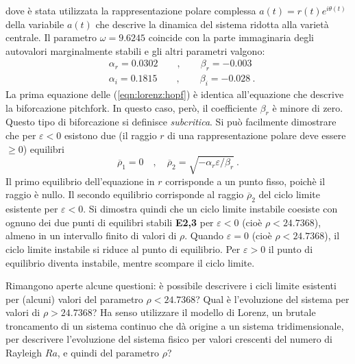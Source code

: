 dove è stata utilizzata la rappresentazione polare complessa $a(t) = r(t) e^{i \theta(t)}$
 della variabile $a(t)$ che descrive la dinamica del sistema ridotta alla varietà centrale.
 Il parametro $\omega = 9.6245$ coincide con la parte immaginaria degli autovalori marginalmente
 stabili e gli altri parametri valgono:
\begin{equation}
\begin{aligned}
 & \alpha_r = 0.0302 \qquad , \qquad \beta_r =-0.003 \\
 & \alpha_i = 0.1815 \qquad , \qquad \beta_i =-0.028 \ . 
\end{aligned}
\end{equation}
La prima equazione delle (\ref{eqn:lorenz:hopf}) è identica all'equazione che descrive la 
 biforcazione pitchfork. In questo caso, però, il coefficiente $\beta_r$ è minore di zero. Questo
 tipo di biforcazione si definisce \textit{subcritica}. Si può facilmente dimostrare che
 per $\varepsilon < 0$ esistono due (il raggio $r$ di una rappresentazione polare deve
 essere $\geq 0$) equilibri
\begin{equation}
 \overline{\rho}_1 = 0 \quad , \quad \overline{\rho}_2 = \sqrt{-\alpha_r \varepsilon / \beta_r} \ .
\end{equation}
Il primo equilibrio dell'equazione in $r$ corrisponde a un punto fisso, poichè il raggio è nullo.
 Il secondo equilibrio corrisponde al raggio $\overline{\rho}_2$ del ciclo limite
 esistente per $\varepsilon < 0$.
Si dimostra quindi che un ciclo limite instabile coesiste con ognuno dei due punti di
 equilibri stabili \textbf{E2,3} per $\varepsilon < 0$ (cioè $\rho < 24.7368$), almeno
 in un intervallo finito di valori di $\rho$.
Quando $\varepsilon = 0$ (cioè $\rho < 24.7368$), il ciclo limite instabile si riduce al punto
 di equilibrio. Per $\varepsilon > 0$ il punto di equilibrio diventa instabile, mentre
 scompare il ciclo limite.

\vspace{0.5cm}
\noindent
 Rimangono aperte alcune questioni: è possibile descrivere i cicli limite esistenti per (alcuni)
 valori del parametro $\rho < 24.7368$? Qual è l'evoluzione del sistema per valori
 di $\rho > 24.7368$? Ha senso utilizzare il modello di Lorenz, un brutale troncamento di
 un sistema continuo che dà origine a un sistema tridimensionale, per descrivere l'evoluzione
 del sistema fisico per valori crescenti del numero di Rayleigh $Ra$, e quindi del
 parametro $\rho$?

